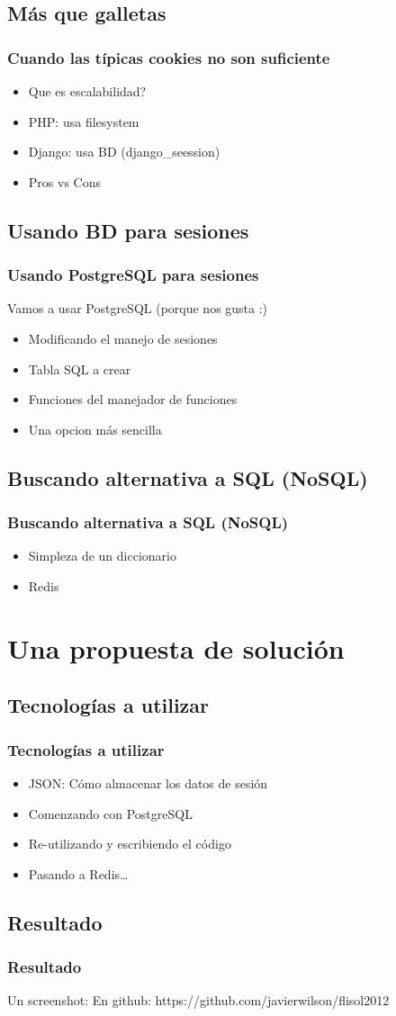 \documentclass{beamer}
\begin{document}
\subsection{Más que galletas} 
\begin{frame}\frametitle{Cuando las típicas cookies no son suficiente}
\begin{itemize}
\item Que es escalabilidad? \pause
\item PHP: usa filesystem \pause
\item Django: usa BD (django\_seession) \pause
\item Pros vs Cons
\end{itemize} 
\end{frame}

\subsection{Usando BD para sesiones} 
\begin{frame}\frametitle{Usando PostgreSQL para sesiones}
Vamos a usar PostgreSQL (porque nos gusta :)
\begin{itemize}
\item Modificando el manejo de sesiones \pause
\item Tabla SQL a crear \pause
\item Funciones del manejador de funciones \pause
\item Una opcion más sencilla
\end{itemize} 
\end{frame}

\subsection{Buscando alternativa a SQL (NoSQL)} 
\begin{frame}\frametitle{Buscando alternativa a SQL (NoSQL)}
\begin{itemize}
\item Simpleza de un diccionario
\item Redis
\end{itemize} 
\end{frame}

\section{Una propuesta de solución}
\subsection{Tecnologías a utilizar}
\begin{frame}\frametitle{Tecnologías a utilizar}
\begin{itemize}
\item JSON: Cómo almacenar los datos de sesión
\item Comenzando con PostgreSQL
\item Re-utilizando y escribiendo el código
\item Pasando a Redis\ldots
\end{itemize} 
\end{frame}

\subsection{Resultado}
\begin{frame}\frametitle{Resultado}
Un screenshot:
En github: https://github.com/javierwilson/flisol2012
\end{frame}
\end{document}
